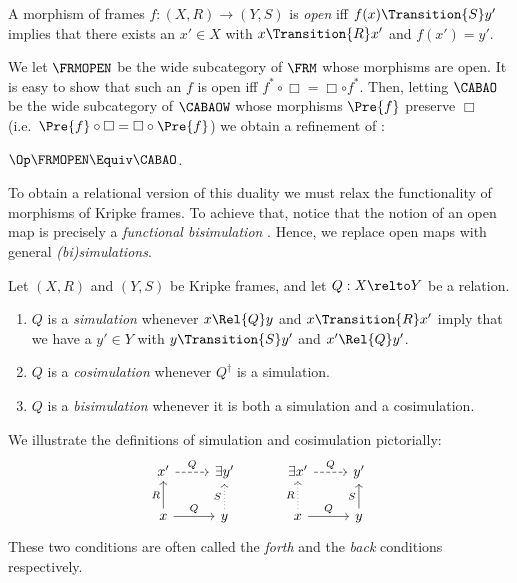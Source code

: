 \documentclass[a4paper,UKenglish,cleveref, autoref]{lipics-v2021}
\begin{document}
\begin{definition}
  A morphism of frames \(f : (X, R) \to (Y, S)\) is \emph{open} iff
  $f(x) \Transition{S} y'$ implies that there exists an $x' \in X$ with
  $x \Transition{R} x'$ and $f(x') = y'$.
\end{definition}

We let $\FRMOPEN$ be the wide subcategory of $\FRM$ whose morphisms
are open.  It is easy to show that such an $f$ is open iff
\(f^* \circ \Box = \Box \circ f^*\). Then, letting $\CABAO$ be the
wide subcategory of $\CABAOW$ whose morphisms $\Pre{f}$ preserve
$\Box$ (i.e.\ $\Pre{f} \circ \Box = \Box \circ \Pre{f}$) we obtain a
refinement of :

\begin{theorem}
  \label{theorem:open-thomason}
  $\Op\FRMOPEN \Equiv \CABAO$.
\end{theorem}

To obtain a relational version of this duality we must relax the functionality
of morphisms of Kripke frames. To achieve that, notice that the notion of an
open map is precisely a \emph{functional bisimulation} \cite[\S
3.2]{sangiorgi_2009}. Hence, we replace open maps with general
\emph{(bi)simulations}.

\begin{definition}
  Let $(X, R)$ and $(Y, S)$ be Kripke frames, and let $Q : X \relto Y$ be a
  relation.
  \begin{enumerate}
    \item $Q$ is a \emph{simulation} whenever \(x \Rel{Q} y\) and \(x
      \Transition{R} x'\) imply that we have a \(y' \in Y\) with \(y
      \Transition{S} y'\) and \(x' \Rel{Q} y'\).
    \item $Q$ is a \emph{cosimulation} whenever $Q^\dagger$ is a simulation.
    \item $Q$ is a \emph{bisimulation} whenever it is both a simulation and a
          cosimulation.
  \end{enumerate}
\end{definition}

We illustrate the definitions of simulation and cosimulation pictorially:
\[
  \begin{tikzcd}
    x' \ar[r,dashed,"Q"] & {\exists y'} \\
    x \ar[u,"R"] \ar[r,"Q"] & y \ar[u,dotted,"S"]
  \end{tikzcd}
  \quad\quad\quad
  \begin{tikzcd}
    {\exists x'} \ar[r,dashed,"Q"] & y' \\
    x \ar[u,dotted,"R"] \ar[r,"Q"] & y \ar[u,"S"]
  \end{tikzcd}
\]
These two conditions are often called the \emph{forth} and the \emph{back}
conditions respectively.
\end{document}
